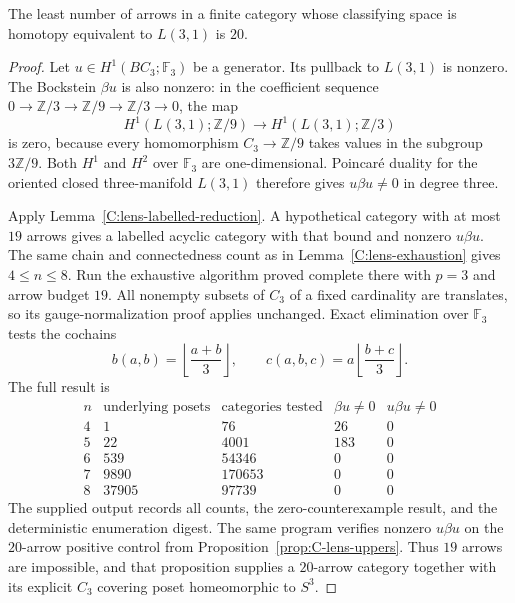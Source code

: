 \begin{theorem}
\label{C:L31-minimum}
The least number of arrows in a finite category whose classifying space
is homotopy equivalent to $L(3,1)$ is $20$.
\end{theorem}
\begin{proof}
Let $u\in H^1(BC_3;\mathbb F_3)$ be a generator. Its pullback to
$L(3,1)$ is nonzero. The Bockstein $\beta u$ is also nonzero: in the
coefficient sequence
$0\to\mathbb Z/3\to\mathbb Z/9\to\mathbb Z/3\to0$, the map
\[
 H^1(L(3,1);\mathbb Z/9)\longrightarrow
 H^1(L(3,1);\mathbb Z/3)
\]
is zero, because every homomorphism $C_3\to\mathbb Z/9$ takes values
in the subgroup $3\mathbb Z/9$. Both $H^1$ and $H^2$ over
$\mathbb F_3$ are one-dimensional. Poincar\'e duality for the oriented
closed three-manifold $L(3,1)$ therefore gives $u\beta u\ne0$ in
degree three.

Apply Lemma~\ref{C:lens-labelled-reduction}. A hypothetical category
with at most $19$ arrows gives a labelled acyclic category with that
bound and nonzero $u\beta u$. The same chain and connectedness count
as in Lemma~\ref{C:lens-exhaustion} gives $4\leq n\leq8$.
Run the exhaustive algorithm proved complete there with $p=3$ and
arrow budget $19$. All nonempty subsets of $C_3$ of a fixed cardinality
are translates, so its gauge-normalization proof applies unchanged.
Exact elimination over $\mathbb F_3$ tests the cochains
\[
 b(a,b)=\left\lfloor\frac{a+b}{3}\right\rfloor,
 \qquad c(a,b,c)=a\left\lfloor\frac{b+c}{3}\right\rfloor.
\]
The full result is
\[
\begin{array}{c|r|r|r|r}
 n&\text{underlying posets}&\text{categories tested}
   &\beta u\ne0&u\beta u\ne0\\\hline
 4&1&76&26&0\\
 5&22&4001&183&0\\
 6&539&54346&0&0\\
 7&9890&170653&0&0\\
 8&37905&97739&0&0
\end{array}
\]
The supplied output  records
all counts, the zero-counterexample result, and the deterministic
enumeration digest. The same program verifies nonzero $u\beta u$ on
the $20$-arrow positive control from
Proposition~\ref{prop:C-lens-uppers}. Thus $19$ arrows are impossible,
and that proposition supplies a $20$-arrow category together with its
explicit $C_3$ covering poset homeomorphic to $S^3$.
\end{proof}

